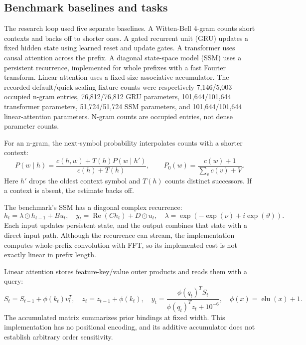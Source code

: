 \subsection{Benchmark baselines and tasks}

The research loop used five separate baselines. A Witten-Bell 4-gram counts short contexts and backs off to shorter ones. A gated recurrent unit (GRU) updates a fixed hidden state using learned reset and update gates. A transformer uses causal attention across the prefix. A diagonal state-space model (SSM) uses a persistent recurrence, implemented for whole prefixes with a fast Fourier transform. Linear attention uses a fixed-size associative accumulator. The recorded default/quick scaling-fixture counts were respectively 7,146/5,003 occupied n-gram entries, 76,812/76,812 GRU parameters, 101,644/101,644 transformer parameters, 51,724/51,724 SSM parameters, and 101,644/101,644 linear-attention parameters. N-gram counts are occupied entries, not dense parameter counts.

For an n-gram, the next-symbol probability interpolates counts with a shorter context:
\begin{equation}
P(w\mid h)=\frac{c(h,w)+T(h)P(w\mid h')}{c(h)+T(h)},\qquad P_0(w)=\frac{c(w)+1}{\sum_vc(v)+V}.
\end{equation}
Here $h'$ drops the oldest context symbol and $T(h)$ counts distinct successors. If a context is absent, the estimate backs off.

The benchmark's SSM has a diagonal complex recurrence:
\begin{equation}
h_t=\lambda\odot h_{t-1}+Bu_t,\quad y_t=\operatorname{Re}(Ch_t)+D\odot u_t,\quad \lambda=\exp(-\exp(\nu)+i\exp(\vartheta)).
\end{equation}
Each input updates persistent state, and the output combines that state with a direct input path. Although the recurrence can stream, the implementation computes whole-prefix convolution with FFT, so its implemented cost is not exactly linear in prefix length.

Linear attention stores feature-key/value outer products and reads them with a query:
\begin{equation}
S_t=S_{t-1}+\phi(k_t)v_t^T,\quad z_t=z_{t-1}+\phi(k_t),\quad y_t=\frac{\phi(q_t)^TS_t}{\phi(q_t)^Tz_t+10^{-6}},\quad \phi(x)=\operatorname{elu}(x)+1.
\end{equation}
The accumulated matrix summarizes prior bindings at fixed width. This implementation has no positional encoding, and its additive accumulator does not establish arbitrary order sensitivity.

